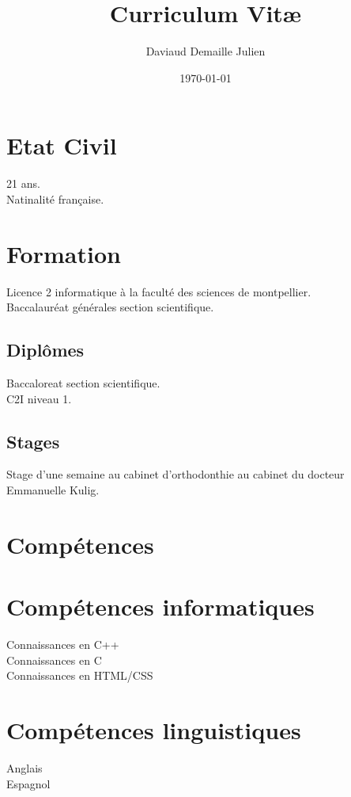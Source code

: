 \documentclass[a4paper]{article}
\title{Curriculum Vit\ae}
\author{Daviaud Demaille Julien}
\date{\today}
\begin{document}
\maketitle

\section{Etat Civil}
\begin{flushleft}
21 ans.
\\Natinalité française.
\end{flushleft}
\section{Formation}
\begin{flushleft}
Licence 2 informatique à la faculté des sciences de montpellier.
\\
Baccalauréat générales section scientifique.
\end{flushleft}

\subsection{Diplômes}
\begin{flushleft}
Baccaloreat section scientifique.
\\
C2I niveau 1.
\end{flushleft}
\subsection{Stages}
\begin{flushleft}
Stage d'une semaine au cabinet d'orthodonthie au cabinet du docteur Emmanuelle Kulig.
\end{flushleft}

\section{Compétences}

\section*{Compétences informatiques}
\begin{flushleft}
Connaissances en C++
\\
Connaissances en C
\\
Connaissances en HTML/CSS
\end{flushleft}

\section*{Compétences linguistiques}
\begin{flushleft}
Anglais
\\Espagnol
\end{flushleft}
\end{document}
